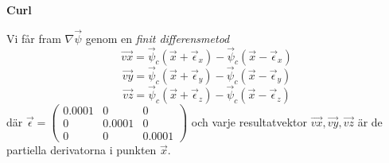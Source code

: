 \documentclass[a4paper]{article}
\begin{document}
\begin{multicols}{2}
\textbf{Curl}

Vi får fram $ \nabla \vec{\psi}$ genom en \textit{finit differensmetod}
\begin{equation}
\vec{vx} = \vec{\psi}_c(\vec{x} + \vec{\epsilon}_x  ) - \vec{\psi}_c(\vec{x} - \vec{\epsilon}_x  )
\end{equation}
\begin{equation}
\vec{vy} = \vec{\psi}_c(\vec{x} + \vec{\epsilon}_y  ) - \vec{\psi}_c(\vec{x} - \vec{\epsilon}_y  )
\end{equation}
\begin{equation}
\vec{vz} = \vec{\psi}_c(\vec{x} + \vec{\epsilon}_z  ) - \vec{\psi}_c(\vec{x} - \vec{\epsilon}_z  )
\end{equation}
där $\vec{\epsilon} = \begin{pmatrix}
0.0001 & 0 & 0\\ 
0 & 0.0001 & 0\\ 
0 & 0 & 0.0001
\end{pmatrix}$ och varje resultatvektor $\vec{vx},\vec{vy},\vec{vz}$ är de partiella derivatorna i punkten $\vec{x}$.


\end{multicols}
\end{document}
